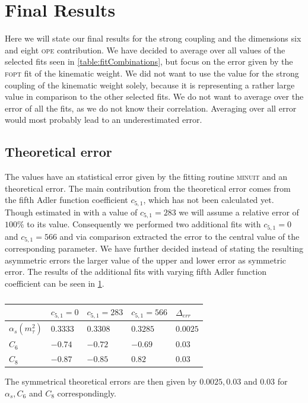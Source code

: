 \documentclass[../../index.tex]{subfiles}
\begin{document}
\section{Final Results}
Here we will state our final results for the strong coupling and the dimensions
six and eight \textsc{ope} contribution. We have decided to average over all
values of the selected fits seen in \cref{table:fitCombinations}, but focus on
the error given by the \textsc{fopt} fit of the kinematic weight. We did not
want to use the value for the strong coupling of the kinematic weight solely,
because it is representing a rather large value in comparison to the other
selected fits. We do not want to average over the error of all the fits, as we
do not know their correlation. Averaging over all error would most probably lead
to an underestimated error.

\subsection{Theoretical error}
The values have an statistical error given by the fitting routine
\textsc{minuit} and an theoretical error. The main contribution from the
theoretical error comes from the fifth Adler function coefficient \(c_{5,1}\),
which has not been calculated yet. Though estimated in \cite{Beneke2008} with a
value of \(c_{5,1} = 283\) we will assume a relative error of \(100\%\) to its
value. Consequently we performed two additional fits with \(c_{5,1} = 0 \) and
\(c_{5,1} = 566\) and via comparison extracted the error to the central value of
the corresponding parameter. We have further decided instead of stating the
resulting asymmetric errors the larger value of the upper and lower error as
symmetric error. The results of the additional fits with varying fifth Adler
function coefficient can be seen in \cref{table:theoreticalError}.
\begin{table}
  \centering
  \begin{tabular}{lllll}
    \toprule
    & \(c_{5,1} = 0\) & \cellcolor{primary}\(c_{5,1}=283\) & \(c_{5,1}=566\) & \(\Delta_{err}\)\\
    \midrule
    \(\alpha_s(m_\tau^2)\) & \(0.3333\) & \cellcolor{primary}\(0.3308\) & \(0.3285\) & \(0.0025\) \\
    \(C_6\) &  \(-0.74\) & \cellcolor{primary}\(-0.72\) & \(-0.69\) & \(0.03\) \\
    \(C_8\) & \(-0.87\) & \cellcolor{primary}\(-0.85\) & \(0.82\) & \(0.03\) \\
    \bottomrule
  \end{tabular}
  \caption{}
  \label{table:theoreticalError}
\end{table}
The symmetrical theoretical errors are then given by \(0.0025, 0.03\) and
\(0.03\) for \(\alpha_s, C_6\) and \(C_8\) correspondingly.
\end{document}

